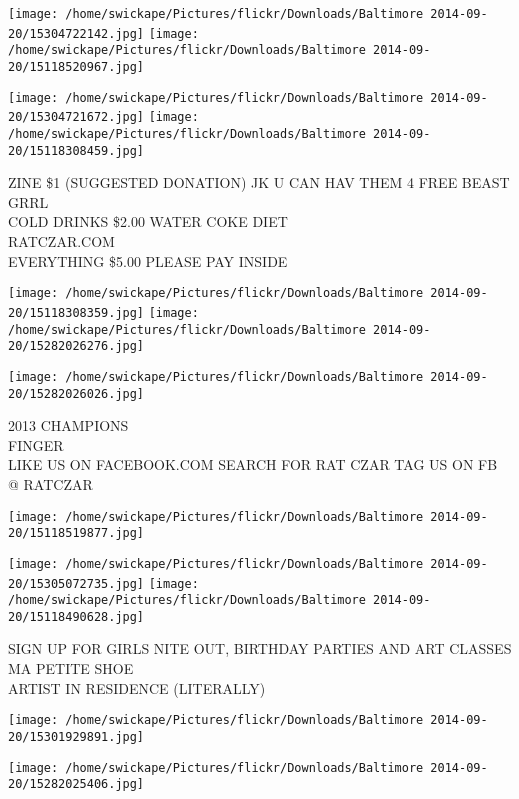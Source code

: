 \documentclass[10pt,letterpaper]{article}
\begin{document}
\texttt{[image: /home/swickape/Pictures/flickr/Downloads/Baltimore 2014-09-20/15304722142.jpg]}
\texttt{[image: /home/swickape/Pictures/flickr/Downloads/Baltimore 2014-09-20/15118520967.jpg]}

\texttt{[image: /home/swickape/Pictures/flickr/Downloads/Baltimore 2014-09-20/15304721672.jpg]}
\texttt{[image: /home/swickape/Pictures/flickr/Downloads/Baltimore 2014-09-20/15118308459.jpg]}

ZINE \$1 (SUGGESTED DONATION) JK U CAN HAV THEM 4 FREE BEAST GRRL\\
COLD DRINKS \$2.00 WATER COKE DIET\\
RATCZAR.COM\\
EVERYTHING \$5.00 PLEASE PAY INSIDE\\
\pagebreak

\texttt{[image: /home/swickape/Pictures/flickr/Downloads/Baltimore 2014-09-20/15118308359.jpg]}
\texttt{[image: /home/swickape/Pictures/flickr/Downloads/Baltimore 2014-09-20/15282026276.jpg]}

\texttt{[image: /home/swickape/Pictures/flickr/Downloads/Baltimore 2014-09-20/15282026026.jpg]}

2013 CHAMPIONS\\
FINGER\\
LIKE US ON FACEBOOK.COM SEARCH FOR RAT CZAR TAG US ON FB @ RATCZAR\\
\pagebreak

\texttt{[image: /home/swickape/Pictures/flickr/Downloads/Baltimore 2014-09-20/15118519877.jpg]}

\vspace{0.25in}
\texttt{[image: /home/swickape/Pictures/flickr/Downloads/Baltimore 2014-09-20/15305072735.jpg]}
\texttt{[image: /home/swickape/Pictures/flickr/Downloads/Baltimore 2014-09-20/15118490628.jpg]}

SIGN UP FOR GIRLS NITE OUT, BIRTHDAY PARTIES AND ART CLASSES\\
MA PETITE SHOE\\
ARTIST IN RESIDENCE (LITERALLY)\\
\pagebreak

\texttt{[image: /home/swickape/Pictures/flickr/Downloads/Baltimore 2014-09-20/15301929891.jpg]}

\vspace{0.25in}
\texttt{[image: /home/swickape/Pictures/flickr/Downloads/Baltimore 2014-09-20/15282025406.jpg]}
\end{document}
